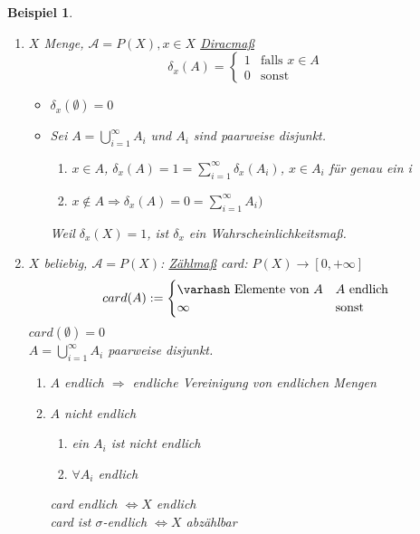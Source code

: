 \documentclass[11pt]{memoir}
\theoremstyle{changebreak}
\newtheorem{Beispiel}{Beispiel}[chapter]
\begin{document}
\begin{Beispiel}
\begin{enumerate}
	\item $X$ Menge, $\mathscr{A} = P(X), x \in X$ \underline{Diracmaß}
	\begin{equation}
		\delta_{x} (A) =
		\begin{cases}
			1 & \text{falls } x \in A\\
			0 & \text{sonst}
		\end{cases}
	\end{equation}
	\begin{itemize}
		\item $\delta_x ( \emptyset) = 0$
		\item Sei $A = \bigcup\limits_{i=1}^{\infty} A_i$ und $A_i$ sind paarweise disjunkt.
		\begin{enumerate}
			\item $x \in A$, $\delta_x(A) = 1 = \sum\limits_{i=1}^{\infty} \delta_x(A_i)$, $x \in A_i$ für genau ein i
			\item $x \notin A \Rightarrow \delta_x(A) = 0 = \sum\limits_{i=1}^{\infty}A_i)$
					\end{enumerate}
		Weil $\delta_x(X) = 1$, ist $\delta_x$ ein Wahrscheinlichkeitsmaß.
	\end{itemize}
	\item $X$ beliebig, $\mathscr{A} = P(X)$: \underline{Zählmaß} card: $P(X) \rightarrow [0, +\infty]$
	\begin{equation}
		card(A) :=
		\begin{cases}
			\varhash \text{ Elemente von } A & A \text{ endlich} \\
			\infty & \text{sonst}
		\end{cases}
	\end{equation}
	$card(\emptyset) = 0$ \\
	$A = \bigcup\limits_{i=1}^{\infty} A_i$ paarweise disjunkt.
	\begin{enumerate}
		\item $A$ endlich $\Rightarrow$ endliche Vereinigung von endlichen Mengen
		\item $A$ nicht endlich
		\begin{enumerate}
			\item ein $A_i$ ist nicht endlich
			\item $\forall A_i$ endlich
		\end{enumerate}
		card endlich $\Leftrightarrow X$ endlich \\
		card ist $\sigma$-endlich $\Leftrightarrow X$ abzählbar
	\end{enumerate}
\end{enumerate}
\end{Beispiel}
\end{document}
